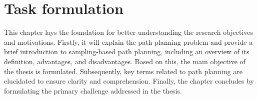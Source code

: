\documentclass{ctuthesis}
\begin{document}
\chapter{Task formulation}   
\label{chap:Task formulation}

This chapter lays the foundation for better understanding the research objectives and motivations.
Firstly, it will explain the path planning problem and provide a brief introduction to sampling-based path planning, 
including an overview of its definition, advantages, and disadvantages. 
Based on this, the main objective of the thesis is formulated. 
Subsequently, key terms related to path planning are elucidated to ensure clarity and comprehension. 
Finally, the chapter concludes by formulating the primary challenge addressed in the thesis.
\end{document}
